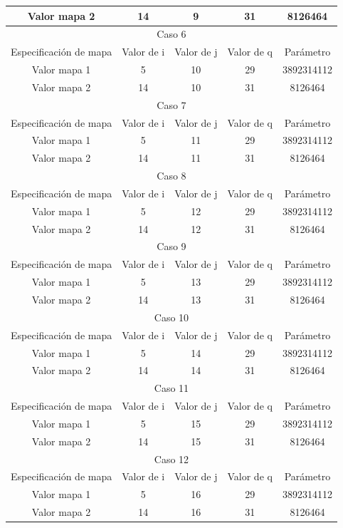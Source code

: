 \documentclass[10pt]{IEEEtran}
\begin{document}
\begin{table}[H]
\begin{tabular}[c]{|c|c|c|c|c|}
\hline
Valor mapa 2 & 14  & 9 & 31 & 8126464 \\
\hline
\hline
\multicolumn{5}{|c|}{Caso 6}\\
\hline
Especificación de mapa & Valor de i & Valor de j & Valor de q & Parámetro \\
\hline
Valor mapa 1 &  5  &  10  & 29 & 3892314112\\

\hline
Valor mapa 2 & 14  &  10  & 31 & 8126464\\
\hline
\hline
\multicolumn{5}{|c|}{Caso 7}\\
\hline
Especificación de mapa & Valor de i & Valor de j & Valor de q & Parámetro \\
\hline
Valor mapa 1 &  5  &  11 & 29 & 3892314112\\

\hline
Valor mapa 2 & 14  & 11 & 31 & 8126464 \\
\hline
\hline
\multicolumn{5}{|c|}{Caso 8}\\
\hline
Especificación de mapa & Valor de i & Valor de j & Valor de q & Parámetro \\
\hline
Valor mapa 1 &  5  &  12 & 29 & 3892314112\\

\hline
Valor mapa 2 & 14  &  12 & 31 & 8126464\\
\hline
\hline
\multicolumn{5}{|c|}{Caso 9}\\
\hline
Especificación de mapa & Valor de i & Valor de j & Valor de q & Parámetro \\
\hline
Valor mapa 1 &  5  &  13  & 29 & 3892314112\\

\hline
Valor mapa 2 & 14  &  13  & 31 & 8126464\\
\hline
\hline
\multicolumn{5}{|c|}{Caso 10}\\
\hline
Especificación de mapa & Valor de i & Valor de j & Valor de q & Parámetro \\
\hline
Valor mapa 1 &  5  &  14  & 29 & 3892314112\\

\hline
Valor mapa 2 & 14  &  14  & 31 & 8126464\\
\hline
\hline
\multicolumn{5}{|c|}{Caso 11}\\
\hline
Especificación de mapa & Valor de i & Valor de j & Valor de q & Parámetro \\
\hline
Valor mapa 1 &  5  &  15 & 29 & 3892314112\\

\hline
Valor mapa 2 & 14  &  15 & 31 & 8126464\\
\hline
\hline
\multicolumn{5}{|c|}{Caso 12}\\
\hline
Especificación de mapa & Valor de i & Valor de j & Valor de q & Parámetro \\
\hline
Valor mapa 1 &  5  &  16 & 29 & 3892314112\\

\hline
Valor mapa 2 & 14  &  16 & 31 & 8126464\\
\hline
\hline
\end{tabular}
\end{table}
\end{document}
